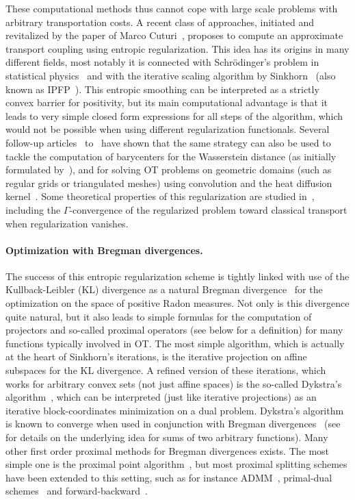These computational methods thus cannot cope with large scale problems with arbitrary transportation costs. A recent class of approaches, initiated and revitalized by the paper of Marco Cuturi~\cite{CuturiSinkhorn}, proposes to compute an approximate transport coupling using entropic regularization. This idea has its origins in many different fields, most notably it is connected with Schr\"odinger's problem in statistical physics~\cite{Schroedinger31,LeonardSchroedinger} and with the iterative scaling algorithm by Sinkhorn~\cite{Sinkhorn64} (also known as IPFP~\cite{DemingStephanIPFP}). 
%
This entropic smoothing can be interpreted as a strictly convex barrier for positivity, but its main computational advantage is that it leads to very simple closed form expressions for all steps of the algorithm, which would not be possible when using different regularization functionals. 
%
Several follow-up articles~\cite{CuturiBarycenter,2015-benamou-cisc} to~\cite{CuturiSinkhorn} have shown that the same strategy can also be used to tackle the computation of barycenters for the Wasserstein distance (as initially formulated by~\cite{agueh2015optimal}), and for solving OT problems on geometric domains (such as regular grids or triangulated meshes) using convolution and the heat diffusion kernel~\cite{2015-solomon-siggraph}. 
%
Some theoretical properties of this regularization are studied in~\cite{2015-carlier-convergence}, including the $\Gamma$-convergence of the regularized problem toward classical transport when regularization vanishes. 

\paragraph{Optimization with Bregman divergences.}

The success of this entropic regularization scheme is tightly linked with use of the Kullback-Leibler (KL) divergence as a natural Bregman divergence~\cite{bregman1967relaxation} for the optimization on the space of positive Radon measures. Not only is this divergence quite natural, but it also leads to simple formulas for the computation of projectors and so-called proximal operators (see below for a definition) for many functions typically involved in OT.  
%
The most simple algorithm, which is actually at the heart of Sinkhorn's iterations, is the iterative projection on affine subspaces for the KL divergence.
%
A refined version of these iterations, which works for arbitrary convex sets (not just affine spaces) is the so-called Dykstra's algorithm~\cite{Dykstra83}, which can be interpreted (just like iterative projections) as an iterative block-coordinates minimization on a dual problem.  
%
Dykstra's algorithm is known to converge when used in conjunction with Bregman divergences~\cite{bauschke-lewis,CensorReich} (see~\cite{2015-Peyre-siims} for details on the underlying idea for sums of two arbitrary functions).
%
Many other first order proximal methods for Bregman divergences exists. The most simple one is the proximal point algorithm~\cite{EcksteinProxPoint}, but most proximal splitting schemes have been extended to this setting, such as for instance ADMM~\cite{WangBanerjee-ADMM}, primal-dual schemes~\cite{ChambollePock-div} and forward-backward~\cite{NguyenFB2015}.

